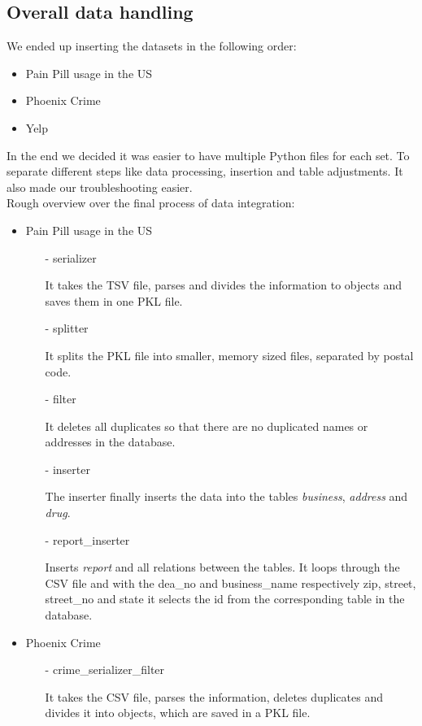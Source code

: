 \subsection*{Overall data handling}
We ended up inserting the datasets in the following order:
\begin{itemize}
    \item Pain Pill usage in the US
    \item Phoenix Crime
    \item Yelp
\end{itemize}
In the end we decided it was easier to have multiple Python files for each set. To separate different steps like data processing, insertion and table adjustments. It also made our troubleshooting easier.\\
Rough overview over the final process of data integration:
\begin{itemize}
    \item Pain Pill usage in the US
    \begin{itemize}
        \item[-] serializer
        \item[] It takes the TSV file, parses and divides the information to objects and saves them in one PKL file.
        \item[-] splitter
        \item[] It splits the PKL file into smaller, memory sized files, separated by postal code.
        \item[-] filter
        \item[] It deletes all duplicates so that there are no duplicated names or addresses in the database.
        \item[-] inserter
        \item[] The inserter finally inserts the data into the tables \textit{business}, \textit{address} and \textit{drug}.
        \item[-] report\_inserter
        \item[] Inserts \textit{report} and all relations between the tables. It loops through the CSV file and with the dea\_no and business\_name respectively zip, street, street\_no and state it selects the id from the corresponding table in the database.
    \end{itemize}
    \item Phoenix Crime
    \begin{itemize}
        \item[-] crime\_serializer\_filter
        \item[]  It takes the CSV file, parses the information, deletes duplicates and divides it into objects, which are saved in a PKL file.

\end{itemize}
\end{itemize}
